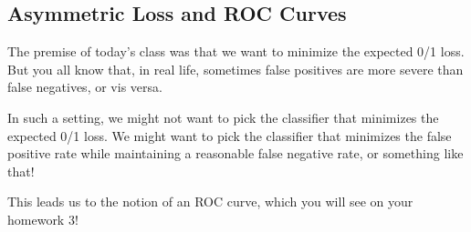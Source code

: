 \subsection{Asymmetric Loss and ROC Curves}

The premise of today's class was that we want to minimize the expected 0/1 loss. But you all know that, in real life, sometimes false positives are more severe than false negatives, or vis versa. 

In such a setting, we might not want to pick the classifier that minimizes the expected 0/1 loss. We might want to pick the classifier that minimizes the false positive rate while maintaining a reasonable false negative rate, or something like that!

This leads us to the notion of an ROC curve, which you will see on your homework 3!

